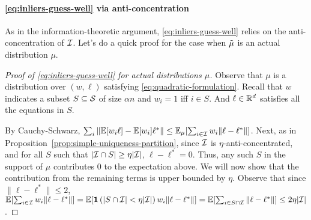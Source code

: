 \paragraph{\eqref{eq:inliers-guess-well} via anti-concentration} As in the information-theoretic argument, \eqref{eq:inliers-guess-well} relies on the anti-concentration of $\mathcal I$.
Let's do a quick proof for the case when $\tilde{\mu}$ is an actual distribution $\mu$. 

\begin{proof}[Proof of \eqref{eq:inliers-guess-well} for actual distributions $\mu$]%
Observe that $\mu$ is a distribution over $(w,\ell)$ satisfying \eqref{eq:quadratic-formulation}. Recall that $w$ indicates a subset $S \subseteq \mathcal S$ of size $\alpha n$ and $w_i = 1$ iff $i \in S$. And $\ell \in \mathbb R^d$ satisfies all the equations in $S$.

By Cauchy-Schwarz, $\sum_i \|\mathbb{E}[w_i \ell] - \mathbb{E}[w_i] \ell^*\| \leq \mathbb{E}_{\mu} [\sum_{i \in \mathcal I} w_i \|\ell - \ell^*\|]$. 
Next, as in Proposition~\ref{prop:simple-uniqueness-partition}, since $\mathcal I$ is $\eta$-anti-concentrated, and for all $S$ such that $|\mathcal I \cap S| \geq \eta |\mathcal I|$,  $\ell-\ell^*= 0$. Thus, any such $S$ in the support of $\mu$ contributes $0$ to the expectation above. We will now show that the contribution from the remaining terms is upper bounded by $\eta$. Observe that since $\|\ell-\ell^*\| \leq 2$, \\$\mathbb{E} [\sum_{i \in \mathcal I} w_i \|\ell - \ell^*\|] = \mathbb{E} [\bm{1}\left(|S \cap \mathcal I|< \eta |\mathcal I|\right)w_i \|\ell - \ell^*\|] = \mathbb{E} [\sum_{i \in S \cap \mathcal I} \|\ell - \ell^*\|]  \leq 2\eta |\mathcal I|$.
\end{proof}





